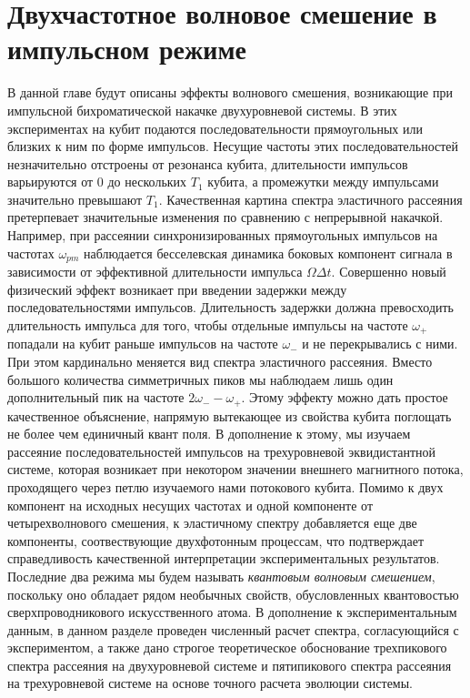 \chapter{Двухчастотное волновое смешение в импульсном режиме}
\label{ch: q_mixing}

В данной главе будут описаны эффекты волнового смешения, возникающие при импульсной бихроматической накачке двухуровневой системы. В этих экспериментах на кубит подаются последовательности прямоугольных или близких к ним по форме импульсов. Несущие частоты этих последовательностей незначительно отстроены от резонанса кубита, длительности импульсов варьируются от $0$ до нескольких $T_1$ кубита, а промежутки между импульсами значительно превышают $T_1$. Качественная картина спектра эластичного рассеяния претерпевает значительные изменения по сравнению с непрерывной накачкой. Например, при рассеянии синхронизированных прямоугольных импульсов на частотах $\omega_{pm}$ наблюдается бесселевская динамика боковых компонент сигнала в зависимости от эффективной длительности импульса $\Omega\Delta t$. Совершенно новый физический эффект возникает при введении задержки между последовательностями импульсов. Длительность задержки должна превосходить длительность импульса для того, чтобы отдельные импульсы на частоте $\omega_+$ попадали на кубит раньше импульсов на частоте $\omega_-$ и не перекрывались с ними. При этом кардинально меняется вид спектра эластичного рассеяния. Вместо большого количества симметричных пиков мы наблюдаем лишь один дополнительный пик на частоте $2\omega_--\omega_+$. Этому эффекту можно дать простое качественное объяснение, напрямую вытекающее из свойства кубита поглощать не более чем единичный квант поля. В дополнение к этому, мы изучаем рассеяние последовательностей импульсов на трехуровневой эквидистантной системе, которая возникает при некотором значении внешнего магнитного потока, проходящего через петлю изучаемого нами потокового кубита. Помимо к двух компонент на исходных несущих частотах и одной компоненте от четырехволнового смешения, к эластичному спектру добавляется еще две компоненты, соотвествующие двухфотонным процессам, что подтверждает справедливость качественной интерпретации экспериментальных результатов. Последние два режима мы будем называть \textit{квантовым волновым смешением}, поскольку оно обладает рядом необычных свойств, обусловленных квантовостью сверхпроводникового искусственного атома. В дополнение к экспериментальным данным, в данном разделе проведен численный расчет спектра, согласующийся с экспериментом, а также дано строгое теоретическое обоснование трехпикового спектра рассеяния на двухуровневой системе и пятипикового спектра рассеяния на трехуровневой системе на основе точного расчета эволюции системы.  
